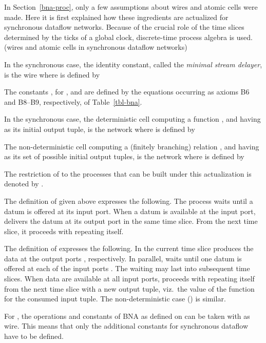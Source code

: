 \documentclass[fleqn]{llncs}
\begin{document}
\begin{table}[tb]
In Section~\ref{bna-proc}, only a few assumptions about wires and atomic
cells were made.
Here it is first explained how these ingredients are actualized for
synchronous dataflow networks.
Because of the crucial role of the time slices determined by the ticks
of a global clock, discrete-time process algebra is used.
\bdfn (wires and atomic cells in synchronous dataflow networks)
\label{dfn-wires-cells-s}

\noindent
In the synchronous case, the identity constant, called the
{\em minimal stream delayer}, is the wire 
where  is defined by

The constants , for , and  are defined by
the equations occurring as axioms B6 and B8--B9, respectively, of
Table~\ref{tbl-bna}.

In the synchronous case, the deterministic cell computing a function
, and having  as its
initial output tuple, is the network 
where  is defined by
\begin{center}

\end{center}
The non-deterministic cell computing a (finitely branching) relation
, and having  as its set of
possible initial output tuples, is the network 
where  is defined by
\begin{center}

\end{center}

The restriction of  to the processes that can be built under
this actualization is denoted by .
\edfn

The definition of  given above expresses the following.
The process  waits until a datum is offered at its input port.
When a datum is available at the input port,  delivers the datum
at its output port in the same time slice.
{From} the next time slice, it proceeds with repeating itself.

\noindent
The definition of  expresses the following.
In the current time slice  produces the data
 at the output ports , respectively.
In parallel,  waits until one datum is offered at each of
the input ports .
The waiting may last into subsequent time slices.
When data are available at all input ports,  proceeds with
repeating itself from the next time slice with a new output tuple, viz.\
the value of the function  for the consumed input tuple.
The non-deterministic case () is similar.

For , the operations and constants of BNA as defined on
 can be taken with  as wire.
This means that only the additional constants for synchronous dataflow
have to be defined.


\end{table}
\end{document}
